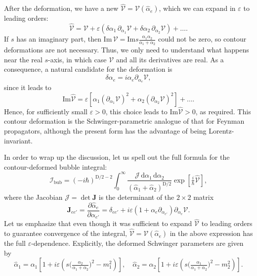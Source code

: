 \documentclass[12pt]{article}
\numberwithin{figure}{section}
\def \be {\begin{equation}}
\def \ee {\end{equation}}
\def \D {\mathrm{D}}
\def \d {\mathrm{d}}
\def \eps {\varepsilon}
\def \V {\mathcal{V}}
\def \JJ {\mathcal{J}}
\def \I {\mathcal{I}}
\def \Im {\mathrm{Im}}
\def \bubble {\mathrm{bub}}
\begin{document}
	After the deformation, we have a new $\hat{\V} = \V(\hat{\alpha}_e)$, which we can expand in $\eps$ to leading orders:
	\be
	\hat{\V} = \V + \eps \left( \delta\alpha_1\, \partial_{\alpha_1} \V + \delta\alpha_2\, \partial_{\alpha_2} \V \right) + \ldots.
	\ee
	If $s$ has an imaginary part, then $\Im\,\V = \Im s \frac{\alpha_1\alpha_2}{\alpha_1 + \alpha_2}$ could not be zero, so contour deformations are not necessary. Thus, we only need to understand what happens near the real $s$-axis, in which case $\V$ and all its derivatives are real. As a consequence, a natural candidate for the deformation is
	\be
	\delta \alpha_e = i \alpha_e \partial_{\alpha_e} \V,
	\ee
	since it leads to
	\be
	\Im \hat{\V} = \eps \left[ \alpha_1 (\partial_{\alpha_1}\V)^2 + \alpha_2 (\partial_{\alpha_2}\V)^2 \right] + \ldots.
	\ee
	Hence, for sufficiently small $\eps>0$, this choice leads to $\Im \hat{\V} > 0$, as required. This contour deformation is the Schwinger-parametric analogue of that for Feynman propagators, although the present form has the advantage of being Lorentz-invariant.
	
	In order to wrap up the discussion, let us spell out the full formula for the contour-deformed bubble integral:
	\be\label{eq:I-bubble4}
	\I_\bubble = \left(-i \hbar \right)^{\D/2-2} \int_{0}^{\infty} \frac{\JJ\, \d\alpha_1\, \d\alpha_2}{(\hat{\alpha}_1 {+} \hat{\alpha}_2)^{\D/2}} \exp \left[\tfrac{i}{\hbar} \hat{\V}\right],
	\ee
	where the Jacobian $\JJ = \det \mathbf{J}$ is the determinant of the $2\times 2$ matrix
	\be
	\mathbf{J}_{e e'} = \frac{\partial \hat{\alpha}_{e}}{\partial \alpha_{e'}} = \delta_{ee'} + i\eps \left(1 + \alpha_e \partial_{\alpha_{e'}}\right) \partial_{\alpha_e} \V.
	\ee
	Let us emphasize that even though it was sufficient to expand $\hat{\V}$ to leading orders to guarantee convergence of the integral, $\hat{\V} = \V(\hat{\alpha}_e)$ in the above expression has the full $\eps$-dependence. Explicitly, the deformed Schwinger parameters are given by
	\be
	\hat{\alpha}_1 = \alpha_1 \left[ 1 + i\eps \left( s \big(\tfrac{\alpha_2}{\alpha_1{+}\alpha_2}\big)^{2} - m_1^2 \right) \right], \quad \hat{\alpha}_2 = \alpha_2 \left[ 1 + i\eps \left( s \big(\tfrac{\alpha_1}{\alpha_1{+}\alpha_2}\big)^{2} - m_2^2 \right)\right].
	\ee
	
\end{document}
